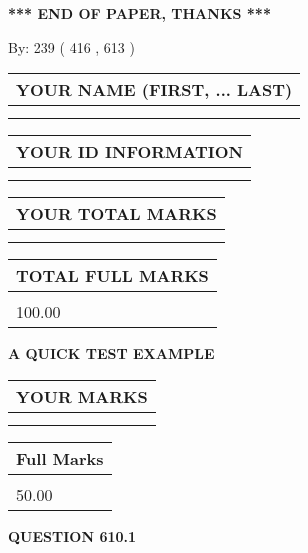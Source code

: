 \documentclass[12pt]{article}
\begin{document}
\vspace{1.0in} 
{\textbf{\large{ *** END OF PAPER, THANKS *** }}} 
   
   
\hspace{1.0in} By: 
 239 ( 416 ,  613 )
   
   
   
   
\newpage 
\setcounter{page}{ 
   610001 } 
   
   
   
   
\noindent\begin{tabular}{|l|}
\hline
YOUR NAME (FIRST, ... LAST)  \\
\hline
 \\ 
 \\ 
\hline
\end{tabular}
\hspace{0.05in} \begin{tabular}{|l|}
\hline
 YOUR   ID   INFORMATION  \\
\hline
 \\ 
 \\ 
\hline
\end{tabular}
   
   
\vspace{0.2in}\noindent\begin{tabular}{|l|}
\hline
YOUR TOTAL MARKS  \\
\hline
 \\ 
 \\ 
\hline
\end{tabular}
\hspace{0.05in} \begin{tabular}{|l|}
\hline
TOTAL FULL MARKS  \\
\hline
 \\ 
100.00 \\
\hline
\end{tabular}
   
   
 \vspace{0.2in}
{\LARGE {\textbf{ A QUICK TEST EXAMPLE}}}
   
   
  
\vspace{0.2in}
  
\noindent\begin{tabular}{|l|}
\hline
 YOUR MARKS  \\
\hline
 \\ 
 \\ 
\hline
\end{tabular}
\hspace{0.05in} \begin{tabular}{|l|}
\hline
 Full Marks  \\
\hline
 \\ 
50.00 \\
\hline
\end{tabular}
{\textbf{\Large{QUESTION
610.1 
}}}
  
\end{document}
